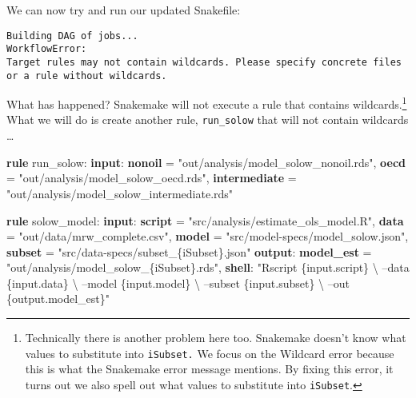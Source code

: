 \documentclass[]{book}
\newenvironment{Shaded}{\begin{snugshade}}{\end{snugshade}}
\newcommand{\KeywordTok}[1]{\textcolor[rgb]{0.13,0.29,0.53}{\textbf{{#1}}}}
\newcommand{\StringTok}[1]{\textcolor[rgb]{0.31,0.60,0.02}{{#1}}}
\newcommand{\NormalTok}[1]{{#1}}
\let\rmarkdownfootnote\footnote%
\def\footnote{\protect\rmarkdownfootnote}
\theoremstyle{definition}
\theoremstyle{definition}
\theoremstyle{definition}
\theoremstyle{remark}
\begin{document}
We can now try and run our updated Snakefile:

\begin{Shaded}
\end{Shaded}

\begin{verbatim}
Building DAG of jobs...
WorkflowError:
Target rules may not contain wildcards. Please specify concrete files or a rule without wildcards.
\end{verbatim}

What has happened? Snakemake will not execute a rule that contains
wildcards.\footnote{Technically there is another problem here too.
  Snakemake doesn't know what values to substitute into
  \texttt{iSubset.} We focus on the Wildcard error because this is what
  the Snakemake error message mentions. By fixing this error, it turns
  out we also spell out what values to substitute into \texttt{iSubset}.}
What we will do is create another rule, \texttt{run\_solow} that will
not contain wildcards \ldots{}

\begin{Shaded}
\begin{Highlighting}[]

\KeywordTok{rule} \NormalTok{run_solow:}
    \KeywordTok{input}\NormalTok{:}
        \KeywordTok{nonoil} \NormalTok{= }\StringTok{"out/analysis/model_solow_nonoil.rds"}\NormalTok{,}
        \KeywordTok{oecd}   \NormalTok{= }\StringTok{"out/analysis/model_solow_oecd.rds"}\NormalTok{,}
        \KeywordTok{intermediate} \NormalTok{= }\StringTok{"out/analysis/model_solow_intermediate.rds"}

\KeywordTok{rule} \NormalTok{solow_model:}
    \KeywordTok{input}\NormalTok{:}
        \KeywordTok{script} \NormalTok{= }\StringTok{"src/analysis/estimate_ols_model.R"}\NormalTok{,}
        \KeywordTok{data}   \NormalTok{= }\StringTok{"out/data/mrw_complete.csv"}\NormalTok{,}
        \KeywordTok{model}  \NormalTok{= }\StringTok{"src/model-specs/model_solow.json"}\NormalTok{,}
        \KeywordTok{subset} \NormalTok{= }\StringTok{"src/data-specs/subset_\{iSubset\}.json"}
    \KeywordTok{output}\NormalTok{:}
        \KeywordTok{model_est} \NormalTok{= }\StringTok{"out/analysis/model_solow_\{iSubset\}.rds"}\NormalTok{,}
    \KeywordTok{shell}\NormalTok{:}
        \StringTok{"Rscript \{input.script\} \textbackslash{}}
\StringTok{            --data \{input.data\} \textbackslash{}}
\StringTok{            --model \{input.model\} \textbackslash{}}
\StringTok{            --subset \{input.subset\} \textbackslash{}}
\StringTok{            --out \{output.model_est\}"}
\end{Highlighting}
\end{Shaded}
\end{document}
